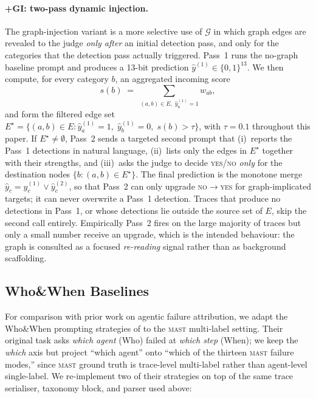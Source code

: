 \paragraph{\textsc{+GI}: two-pass dynamic injection.} The graph-injection
variant is a more selective use of $\mathcal{G}$ in which graph edges are
revealed to the judge \emph{only after} an initial detection pass, and only
for the categories that the detection pass actually triggered. Pass~1 runs
the no-graph baseline prompt and produces a 13-bit prediction
$\hat{y}^{(1)}\!\in\!\{0,1\}^{13}$. We then compute, for every category
$b$, an aggregated incoming score
\[
s(b) \;=\; \sum_{(a,b)\in E,\; \hat{y}^{(1)}_a=1}\!\!w_{ab},
\]
and form the filtered edge set
$E^{\star}=\{(a,b)\in E : \hat{y}^{(1)}_a=1,\; \hat{y}^{(1)}_b=0,\;
s(b)>\tau\}$, with $\tau\!=\!0.1$ throughout this paper. If
$E^{\star}\neq\emptyset$, Pass~2 sends a targeted second prompt that
(i)~reports the Pass~1 detections in natural language, (ii)~lists only the
edges in $E^{\star}$ together with their strengths, and (iii)~asks the
judge to decide \textsc{yes}/\textsc{no} \emph{only} for the destination
nodes $\{b : (a,b)\!\in\!E^{\star}\}$. The final prediction is the
monotone merge $\hat{y}_c=\hat{y}^{(1)}_c \vee \hat{y}^{(2)}_c$, so that
Pass~2 can only upgrade \textsc{no}$\to$\textsc{yes} for graph-implicated
targets; it can never overwrite a Pass~1 detection. Traces that produce no
detections in Pass~1, or whose detections lie outside the source set of
$E$, skip the second call entirely. Empirically Pass~2 fires on the large
majority of traces but only a small number receive an upgrade, which is
the intended behaviour: the graph is consulted as a focused
\emph{re-reading} signal rather than as background scaffolding.

\subsection{Who\&When Baselines}
\label{ssec:wnw}

For comparison with prior work on agentic failure attribution, we adapt
the Who\&When prompting strategies of \citet{yin2025whoandwhen} to the
\textsc{mast} multi-label setting. Their original task asks
\emph{which agent} (Who) failed at \emph{which step} (When); we keep the
\emph{which} axis but project ``which agent'' onto ``which of the thirteen
\textsc{mast} failure modes,'' since \textsc{mast} ground truth is
trace-level multi-label rather than agent-level single-label. We
re-implement two of their strategies on top of the same trace serialiser,
taxonomy block, and parser used above:


